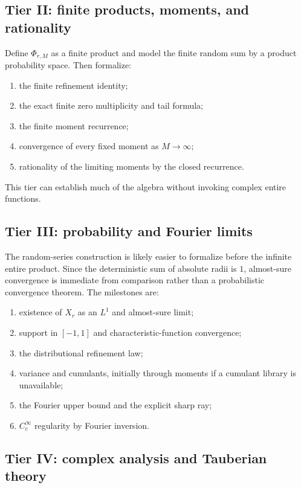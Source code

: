 \documentclass[11pt,a4paper]{article}
\theoremstyle{frontier}
\theoremstyle{definition}
\begin{document}
\subsection{Tier II: finite products, moments, and rationality}

Define $\Phi_{r,M}$ as a finite product and model the finite random sum by a product probability space.  Then formalize:
\begin{enumerate}[label=\textbf{II.\arabic*}]
\item the finite refinement identity;
\item the exact finite zero multiplicity and tail formula;
\item the finite moment recurrence;
\item convergence of every fixed moment as $M\to\infty$;
\item rationality of the limiting moments by the closed recurrence.
\end{enumerate}
This tier can establish much of the algebra without invoking complex entire functions.

\subsection{Tier III: probability and Fourier limits}

The random-series construction is likely easier to formalize before the infinite entire product.  Since the deterministic sum of absolute radii is $1$, almost-sure convergence is immediate from comparison rather than a probabilistic convergence theorem.  The milestones are:
\begin{enumerate}[label=\textbf{III.\arabic*}]
\item existence of $X_r$ as an $L^1$ and almost-sure limit;
\item support in $[-1,1]$ and characteristic-function convergence;
\item the distributional refinement law;
\item variance and cumulants, initially through moments if a cumulant library is unavailable;
\item the Fourier upper bound and the explicit sharp ray;
\item $C_c^\infty$ regularity by Fourier inversion.
\end{enumerate}

\subsection{Tier IV: complex analysis and Tauberian theory}
\end{document}
